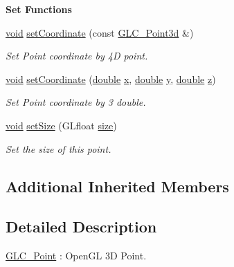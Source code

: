 \begin{Indent}{\bf Set Functions}\par
\begin{DoxyCompactItemize}
\item 
\hyperlink{group___u_a_v_objects_plugin_ga444cf2ff3f0ecbe028adce838d373f5c}{void} \hyperlink{class_g_l_c___point_a8910886617d7d6fe65df9bc3bc4b865a}{set\-Coordinate} (const \hyperlink{glc__vector3d_8h_a4e13a9bbc7ab3d34de7e98b41836772c}{G\-L\-C\-\_\-\-Point3d} \&)
\begin{DoxyCompactList}\small\item\em Set Point coordinate by 4\-D point. \end{DoxyCompactList}\item 
\hyperlink{group___u_a_v_objects_plugin_ga444cf2ff3f0ecbe028adce838d373f5c}{void} \hyperlink{class_g_l_c___point_a15a85cf085980b81f85317188f5f7471}{set\-Coordinate} (\hyperlink{_super_l_u_support_8h_a8956b2b9f49bf918deed98379d159ca7}{double} \hyperlink{glext_8h_a1db9d104e3c2128177f26aff7b46982f}{x}, \hyperlink{_super_l_u_support_8h_a8956b2b9f49bf918deed98379d159ca7}{double} \hyperlink{glext_8h_a42315f3ed8fff752bb47fd782309fcfc}{y}, \hyperlink{_super_l_u_support_8h_a8956b2b9f49bf918deed98379d159ca7}{double} \hyperlink{glext_8h_a642c8d69fd1a54f255c898df4f0dd7ca}{z})
\begin{DoxyCompactList}\small\item\em Set Point coordinate by 3 double. \end{DoxyCompactList}\item 
\hyperlink{group___u_a_v_objects_plugin_ga444cf2ff3f0ecbe028adce838d373f5c}{void} \hyperlink{class_g_l_c___point_a246c1020fa268a2b1c3fb191c16ea1bd}{set\-Size} (G\-Lfloat \hyperlink{glext_8h_a014d89bd76f74ef3a29c8f04b473eb76}{size})
\begin{DoxyCompactList}\small\item\em Set the size of this point. \end{DoxyCompactList}\end{DoxyCompactItemize}
\end{Indent}
\subsection*{Additional Inherited Members}


\subsection{Detailed Description}
\hyperlink{class_g_l_c___point}{G\-L\-C\-\_\-\-Point} \-: Open\-G\-L 3\-D Point. 

